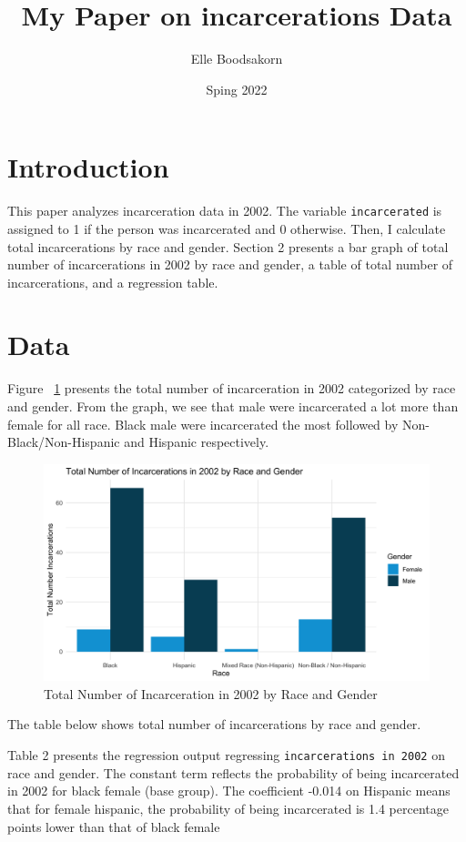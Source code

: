 \documentclass{article}
\author{Elle Boodsakorn}
\title{My Paper on incarcerations Data}
\date{Sping 2022}
\begin{document}
\maketitle

\section{Introduction}

This paper analyzes incarceration data in 2002. The variable \texttt{incarcerated} is assigned to 1 if the person was incarcerated and 0 otherwise. Then, I calculate total incarcerations by race and gender. Section 2 presents a bar graph of total number of incarcerations in 2002 by race and gender, a table of total number of incarcerations, and a regression table.

\newpage

\section{Data}

Figure ~\ref{fig:graph} presents the total number of incarceration in 2002 categorized by race and gender. From the graph, we see that male were incarcerated a lot more than female for all race. Black male were incarcerated the most followed by Non-Black/Non-Hispanic and Hispanic respectively.


\begin{figure}[H]
    \begin{center}
        \includegraphics[width=.85\textwidth]{incarcerations_by_racegender}
    \end{center}
    \caption{Total Number of Incarceration in 2002 by Race and Gender}
    \label{fig:graph}
\end{figure}


The table below shows total number of incarcerations by race and gender.



Table 2 presents the regression output regressing \texttt{incarcerations in 2002} on race and gender. The constant term reflects the probability of being incarcerated in 2002 for black female (base group). The coefficient -0.014 on Hispanic means that for female hispanic, the probability of being incarcerated is 1.4 percentage points lower than that of black female


\end{document}
